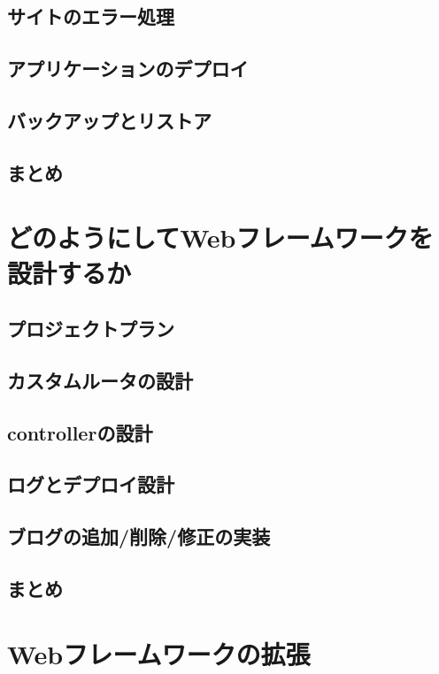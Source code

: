 \subsection{サイトのエラー処理}

\subsection{アプリケーションのデプロイ}

\subsection{バックアップとリストア}

\subsection{まとめ}


\section{どのようにしてWebフレームワークを設計するか}

\subsection{プロジェクトプラン}

\subsection{カスタムルータの設計}

\subsection{controllerの設計}

\subsection{ログとデプロイ設計}

\subsection{ブログの追加/削除/修正の実装}

\subsection{まとめ}


\section{Webフレームワークの拡張}

